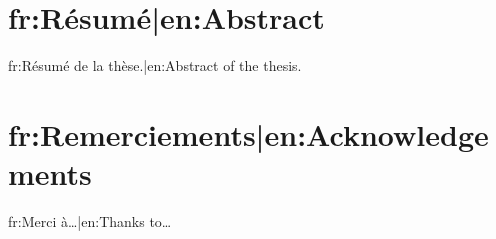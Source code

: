 \chapter*{{{fr:Résumé|en:Abstract}}}
{{fr:Résumé de la thèse.|en:Abstract of the thesis.}}

\chapter*{{{fr:Remerciements|en:Acknowledgements}}}
{{fr:Merci à…|en:Thanks to…}}
